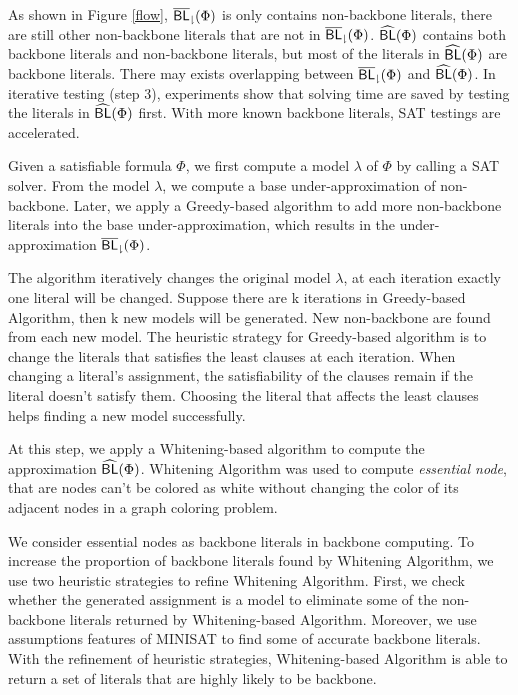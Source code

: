 As shown in Figure \ref{flow}, ${\sf \overline{BL}_\downharpoonright}(\Phi)$ is only contains non-backbone literals, there are still other non-backbone literals that are not in ${\sf \overline{BL}_\downharpoonright}(\Phi)$.
${\sf \widehat{BL}}(\Phi)$ contains both backbone literals and non-backbone literals, but most of the literals in ${\sf \widehat{BL}}(\Phi)$ are backbone literals. There may exists overlapping between ${\sf \overline{BL}_\downharpoonright}(\Phi)$ and ${\sf \widehat{BL}}(\Phi)$.
In iterative testing (step 3), experiments show that solving time are saved by testing the literals in ${\sf \widehat{BL}}(\Phi)$ first. With more known backbone literals, SAT testings are accelerated.

\medskip
{}
Given a satisfiable formula $\Phi$, we first compute a model $\lambda$ of $\Phi$ by calling a SAT solver.
From the model $\lambda$, we compute a base under-approximation of non-backbone.
Later, we apply a Greedy-based algorithm to add more non-backbone literals into the base under-approximation, which results in the
under-approximation ${\sf \overline{BL}_\downharpoonright}(\Phi)$.

The algorithm iteratively changes the original model $\lambda$, at each iteration exactly one literal will be changed. Suppose there are k iterations in Greedy-based Algorithm, then k new models will be generated. New non-backbone are found from each new model. The heuristic strategy for Greedy-based algorithm is to change the literals that satisfies the least clauses at each iteration. When changing a literal's assignment, the satisfiability of the clauses remain if the literal doesn't satisfy them. Choosing the literal that affects the least clauses helps finding a new model successfully.

\medskip
{}
At this step, we apply a Whitening-based algorithm to compute the approximation ${\sf \widehat{BL}}(\Phi)$.
Whitening Algorithm was used to compute \emph{essential node}, that are nodes can't be colored as white without changing the color of its adjacent nodes in a graph coloring problem.


We consider essential nodes as backbone literals in backbone computing.
To increase the proportion of backbone literals found by Whitening Algorithm, we use two heuristic strategies to refine Whitening Algorithm.
First, we check whether the generated assignment is a model to eliminate some of the non-backbone literals returned by Whitening-based Algorithm.
Moreover, we use assumptions features of MINISAT \cite{JLM15} to find some of accurate backbone literals.
With the refinement of heuristic strategies, Whitening-based Algorithm is able to return a set of literals that are highly likely to be backbone.


